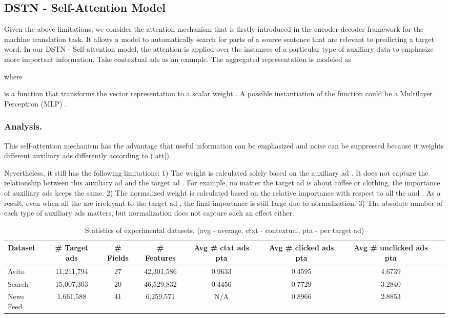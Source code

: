 \documentclass[sigconf]{acmart}
\begin{document}
\subsection{DSTN - Self-Attention Model} \label{sec_att}
Given the above limitations, we consider the attention mechanism \cite{bahdanau2014neural} that is firstly introduced in the encoder-decoder framework for the machine translation task. It allows a model to automatically search for parts of a source sentence that are relevant to predicting a target word.
In our DSTN - Self-attention model, the attention is applied over the instances of a particular type of auxiliary data to emphasize more important information. Take contextual ads as an example. The aggregated representation  is modeled as

where

 is a function that transforms the vector representation  to a scalar weight . A possible instantiation of the  function could be a Multilayer Perceptron (MLP) \cite{bahdanau2014neural}.

\subsubsection{Analysis.}
This self-attention mechanism has the advantage that useful information can be emphasized and noise can be suppressed because it weights different auxiliary ads  differently according to (\ref{att}).

Nevertheless, it still has the following limitations: 1) The weight  is calculated solely based on the auxiliary ad . It does not capture the relationship between this auxiliary ad and the target ad . For example, no matter the target ad  is about coffee or clothing, the importance of auxiliary ads keeps the same.
2) The normalized weight  is calculated based on the relative importance with respect to all the  and . As a result, even when all the  are irrelevant to the target ad , the final importance  is still large due to normalization. 3) The absolute number of each type of auxiliary ads matters, but normalization does not capture such an effect either.

\begin{table*}[!th]
\renewcommand{\arraystretch}{1.1}
\caption{Statistics of experimental datasets. (avg - average, ctxt - contextual, pta - per target ad)}
\vskip -8pt
\label{tab_stat}
\centering
\begin{tabular}{|l|c|c|c|c|c|c|c|}
\hline
\textbf{Dataset} & \textbf{\# Target ads} & \textbf{\# Fields} & \textbf{\# Features} & \textbf{Avg \# ctxt ads pta} & \textbf{Avg \# clicked ads pta} & \textbf{Avg \# unclicked ads pta}\\
\hline
Avito & 11,211,794 & 27 & 42,301,586 & 0.9633 & 0.4595 & 4.6739 \\
\hline
Search & 15,007,303 & 20 & 46,529,832 & 0.4456 & 0.7729 & 3.2840 \\
\hline
News Feed & 1,661,588  & 41 & 6,259,571 & N/A & 0.8966 & 2.8853 \\
\hline
\end{tabular}
\end{table*}
\end{document}
